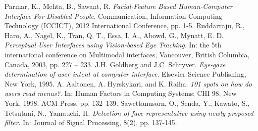 \documentclass[a4paper,10pt]{article}
\begin{document}
\begin{thebibliography}{4}
 Parmar, K., Mehta, B., Sawant, R. \emph{Facial-Feature Based Human-Computer Interface For Disabled People}. Communication, Information Computing Technology (ICCICT), 2012 International Conference, pp. 1-5.
 Ruddarraju, R., Haro, A., Nagel, K., Tran, Q. T., Essa, I. A., Abowd, G., Mynatt, E. D. \emph{Perceptual User Interfaces using Vision-based Eye Tracking}. In: the 5th international conference on Multimodal interfaces, Vancouver, British Columbia, Canada, 2003, pp. 227 – 233.
 J.H. Goldberg and J.C. Schryver. \emph{Eye-gaze determination of user intent at computer interface}. Elsevier Science Publishing, New York, 1995.
 A. Aaltonen, A. Hyrskykari, and K. Raiha. \emph{101 spots on how do users read menus?}. In: Human Factors in Computing Systems: CHI 98, New York, 1998. ACM Press, pp. 132–139.
 Sawettanusorn, O., Senda, Y., Kawato, S., Tetsutani, N., Yamauchi, H. \emph{Detection of face representative using newly proposed filter}. In: Journal of Signal Processing, 8(2), pp. 137-145.

\end{thebibliography}
\end{document}
